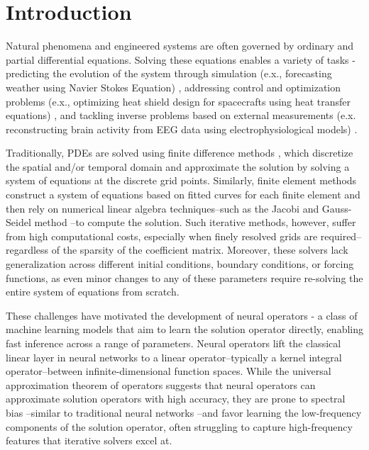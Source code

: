 \documentclass[12pt]{article}
\begin{document}
	\MakeScribeTop

\section{Introduction} \label{sec:intro}

Natural phenomena and engineered systems are often governed by ordinary and partial differential equations. Solving these equations enables a variety of tasks - predicting the evolution of the system through simulation (e.x., forecasting weather using Navier Stokes Equation) \autocite{kalnay2003atmospheric,bauer2015quiet,staniforth1991semi}, addressing control and optimization problems (e.x., optimizing heat shield design for spacecrafts using heat transfer equations) \autocite{anderson1989hypersonic,troltzsch2010optimal}, and tackling inverse problems based on external measurements (e.x. reconstructing brain activity from EEG data using electrophysiological models) \autocite{baillet2001electromagnetic,grech2008review}. 

Traditionally, PDEs are solved using finite difference methods \autocite{smith1985numerical,leveque2007finite}, which discretize the spatial and/or temporal domain and approximate the solution by solving a system of equations at the discrete grid points. Similarly, finite element methods \autocite{hughes2003finite,bathe2006finite,brenner2008mathematical} construct a system of equations based on fitted curves for each finite element and then rely on numerical linear algebra techniques--such as the Jacobi and Gauss-Seidel method \autocite{saad2003iterative}--to compute the solution. Such iterative methods, however, suffer from high computational costs, especially when finely resolved grids are required--regardless of the sparsity of the coefficient matrix. Moreover, these solvers lack generalization across different initial conditions, boundary conditions, or forcing functions, as even minor changes to any of these parameters require re-solving the entire system of equations from scratch. 

These challenges have motivated the development of neural operators \autocite{kovachki2023neural} - a class of machine learning models that aim to learn the solution operator directly, enabling fast inference across a range of parameters. Neural operators lift the classical linear layer in neural networks to a linear operator--typically a kernel integral operator--between infinite-dimensional function spaces. While the universal approximation theorem of operators \autocite{chen1995universal} suggests that neural operators can approximate solution operators with high accuracy, they are prone to spectral bias \autocite{liu2021multiscale,liu2024mitigating,you2024mscalefno,khodakarami2025mitigating,xu2025understanding}--similar to traditional neural networks \autocite{rahaman2019spectral,xu2019frequency}--and favor learning the low-frequency components of the solution operator, often struggling to capture high-frequency features that iterative solvers excel at. 
\end{document}
